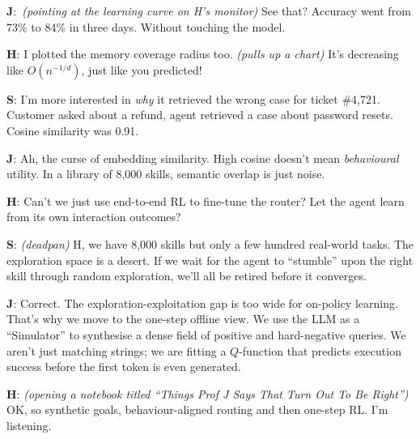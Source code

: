 \documentclass[11pt,a4paper]{article}
\newcommand{\J}[0]{{\sffamily\bfseries\color{marginJ}J}}
\newcommand{\Hstudent}[0]{{\sffamily\bfseries\color{marginH}H}}
\newcommand{\Senior}[0]{{\sffamily\bfseries\color{marginS}S}}
\newcommand{\stage}[1]{{\small\itshape\color{black!50}(#1)}}
\begin{document}
\begin{dialogue}

\J:~\stage{pointing at the learning curve on H's monitor} See that? Accuracy went from 73\% to 84\% in three days. Without touching the model.

\vspace{4pt}
\Hstudent: I plotted the memory coverage radius too. \stage{pulls up a chart} It's decreasing like $O(n^{-1/d})$, just like you predicted!

\vspace{4pt}
\Senior: I'm more interested in \textit{why} it retrieved the wrong case for ticket \#4,721. Customer asked about a refund, agent retrieved a case about password resets. Cosine similarity was 0.91. 

\vspace{4pt}
\J: Ah, the curse of embedding similarity. High cosine doesn't mean \textit{behavioural} utility. In a library of 8,000 skills, semantic overlap is just noise. 

\vspace{4pt}
\Hstudent: Can't we just use end-to-end RL to fine-tune the router? Let the agent learn from its own interaction outcomes?

\vspace{4pt}
\Senior: \stage{deadpan} H, we have 8,000 skills but only a few hundred real-world tasks. The exploration space is a desert. If we wait for the agent to ``stumble'' upon the right skill through random exploration, we'll all be retired before it converges.

\vspace{4pt}
\J: Correct. The exploration-exploitation gap is too wide for on-policy learning. That's why we move to the one-step offline view. We use the LLM as a ``Simulator'' to synthesise a dense field of positive and hard-negative queries. We aren't just matching strings; we are fitting a $Q$-function that predicts execution success before the first token is even generated.

\vspace{4pt}
\Hstudent: \stage{opening a notebook titled ``Things Prof J Says That Turn Out To Be Right''} OK, so synthetic goals, behaviour-aligned routing and then one-step RL. I'm listening.

\end{dialogue}

\end{document}
